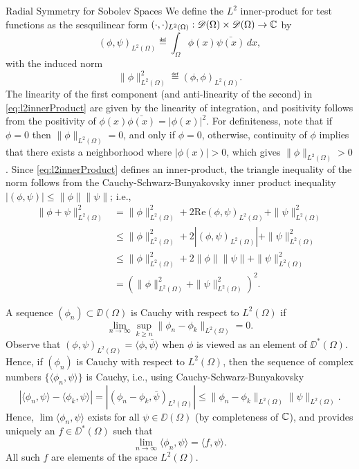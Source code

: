 \begin{chapter}{Radial Symmetry for Sobolev Spaces}
We define the $L^2$ inner-product for test functions as the sesquilinear form $(\cdot,\cdot)_{L^2(\Omega)}:\mathscr D(\Omega)\times\mathscr D(\Omega) \to \mathbb C$ by 
\begin{equation} \label{eq:l2innerProduct}
  (\phi,\psi)_{L^2(\Omega)} \eqdef \int_{\Omega} \phi(x)\bar{\psi(x)}\,dx,
\end{equation}
with the induced norm 
\begin{equation} \label{eq:l2norm}
  \|\phi\|^2_{L^2(\Omega)} \eqdef (\phi,\phi)_{L^2(\Omega)}.
\end{equation}
The linearity of the first component (and anti-linearity of the second) in \eqref{eq:l2innerProduct} are given by the linearity of integration, and positivity follows from the positivity of $\phi(x)\bar{\phi(x)} = |\phi(x)|^2$. 
For definiteness, note that if $\phi = 0$ then $\|\phi\|_{L^2(\Omega)} = 0$, and only if $\phi = 0$, otherwise, continuity of $\phi$ implies that there exists a neighborhood where $|\phi(x)| > 0$, which gives $\|\phi\|_{L^2(\Omega)} > 0$.
Since \eqref{eq:l2innerProduct} defines an inner-product, the triangle inequality of the norm follows from the Cauchy-Schwarz-Bunyakovsky inner product inequality $|(\phi,\psi)|\le \|\phi\|\|\psi\|$; i.e.,
\begin{align}
  \|\phi + \psi\|_{L^2(\Omega)}^2 
    &= \|\phi\|_{L^2(\Omega)}^2 + 2\mathrm{Re} (\phi,\psi)_{L^2(\Omega)}  + \|\psi\|_{L^2(\Omega)}^2 \nonumber\\
    &\le \|\phi\|_{L^2(\Omega)}^2 + 2|(\phi,\psi)_{L^2(\Omega)}|  + \|\psi\|_{L^2(\Omega)}^2 \nonumber\\
    &\le \|\phi\|_{L^2(\Omega)}^2 + 2\|\phi\|\|\psi\|  + \|\psi\|_{L^2(\Omega)}^2 \nonumber \\
    &= (\|\phi\|_{L^2(\Omega)}^2 + \|\psi\|_{L^2(\Omega)}^2)^2.
\end{align}

A sequence $(\phi_n)\subset \DD(\Omega)$ is Cauchy with respect to $L^2(\Omega)$ if
\begin{equation} 
  \lim_{n\to\infty}\sup_{k\ge n} \|\phi_n - \phi_k\|_{L^2(\Omega)} = 0.
\end{equation}
Observe that $(\phi,\psi)_{L^2(\Omega)} = \langle \phi,\bar{\psi}\rangle$ when $\phi$ is viewed as an element of $\DD^*(\Omega)$.
Hence, if $(\phi_n)$ is Cauchy with respect to $L^2(\Omega)$, then the sequence of complex numbers $\big\{\langle \phi_n,\psi\rangle\big\}$ is Cauchy, i.e., using Cauchy-Schwarz-Bunyakovsky
\begin{equation}
  |\langle \phi_n, \psi \rangle - \langle \phi_k,\psi\rangle| 
    = |(\phi_n - \phi_k,\bar{\psi})_{L^2(\Omega)}|  
    \le \|\phi_n - \phi_k\|_{L^2(\Omega)}\|\psi\|_{L^2(\Omega)}. \label{eq:cauchySchwarz}
\end{equation}
Hence, $\lim\langle \phi_n,\psi\rangle$ exists for all $\psi \in \DD(\Omega)$ (by completeness of $\mathbb C$), and  provides uniquely an $f \in \DD^*(\Omega)$ such that
\begin{equation}
  \lim_{n\to\infty} \langle \phi_n, \psi\rangle = \langle f,\psi\rangle.
\end{equation}
All such $f$ are elements of the space $L^2(\Omega)$.


\end{chapter}
